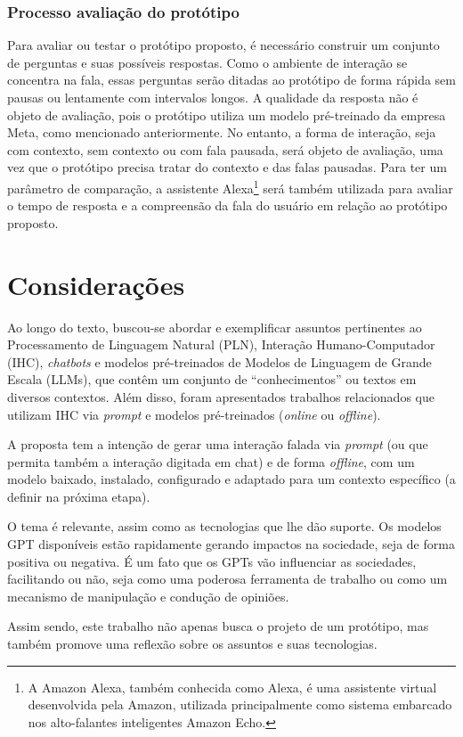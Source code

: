 \documentclass[10pt, conference, compsocconf]{IEEEtran}
\begin{document}
\FloatBarrier


\subsubsection{Processo avaliação do protótipo}

Para avaliar ou testar o protótipo proposto, é necessário construir um conjunto de perguntas e suas possíveis respostas. Como o ambiente de interação se concentra na fala, essas perguntas serão ditadas ao protótipo de forma rápida sem pausas ou lentamente com intervalos longos. A qualidade da resposta não é objeto de avaliação, pois o protótipo utiliza um modelo pré-treinado da empresa Meta, como mencionado anteriormente. No entanto, a forma de interação, seja com contexto, sem contexto ou com fala pausada, será objeto de avaliação, uma vez que o protótipo precisa tratar do contexto e das falas pausadas. Para ter um parâmetro de comparação, a assistente Alexa\footnote{A Amazon Alexa, também conhecida como Alexa, é uma assistente virtual desenvolvida pela Amazon, utilizada principalmente como sistema embarcado nos alto-falantes inteligentes Amazon Echo.} será também utilizada para avaliar o tempo de resposta e a compreensão da fala do usuário em relação ao protótipo proposto.

\section{Considerações}

Ao longo do texto, buscou-se abordar e exemplificar assuntos pertinentes ao Processamento de Linguagem Natural (PLN), Interação Humano-Computador (IHC), \textit{chatbots} e modelos pré-treinados de Modelos de Linguagem de Grande Escala (LLMs), que contêm um conjunto de ``conhecimentos'' ou textos em diversos contextos. Além disso, foram apresentados trabalhos relacionados que utilizam IHC via \textit{prompt} e modelos pré-treinados (\textit{online} ou \textit{offline}).

A proposta tem a intenção de gerar uma interação falada via \textit{prompt} (ou que permita também a interação digitada em chat) e de forma \textit{offline}, com um modelo baixado, instalado, configurado e adaptado para um contexto específico (a definir na próxima etapa).

O tema é relevante, assim como as tecnologias que lhe dão suporte. Os modelos GPT disponíveis estão rapidamente gerando impactos na sociedade, seja de forma positiva ou negativa. É um fato que os GPTs vão influenciar as sociedades, facilitando ou não, seja como uma poderosa ferramenta de trabalho ou como um mecanismo de manipulação e condução de opiniões.

Assim sendo, este trabalho não apenas busca o projeto de um protótipo, mas também promove uma reflexão sobre os assuntos e suas tecnologias.


\printbibliography
\end{document}
